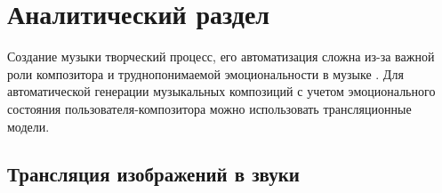 \chapter{Аналитический раздел}

Создание музыки творческий процесс, его автоматизация сложна из-за важной роли композитора и труднопонимаемой эмоциональности в музыке \cite{big}. Для автоматической генерации музыкальных композиций с учетом эмоционального состояния пользователя-композитора можно использовать трансляционные модели\cite{web}.

\section{Трансляция изображений в звуки}
	